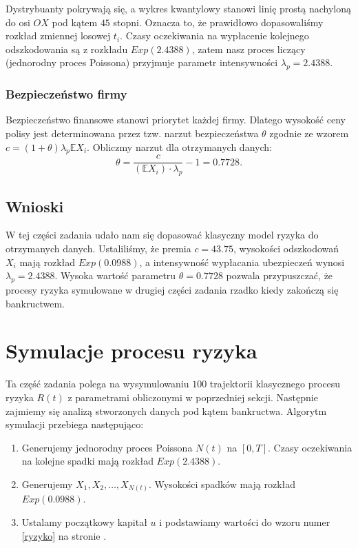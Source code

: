 \documentclass[12pt]{mwart}
\begin{document}
	\noindent Dystrybuanty pokrywają się, a wykres kwantylowy stanowi linię prostą nachyloną do osi $OX$ pod kątem $45$ stopni. Oznacza to, że prawidłowo dopasowaliśmy rozkład zmiennej losowej $t_i$. Czasy oczekiwania na wypłacenie kolejnego odszkodowania są z rozkładu $Exp(2.4388)$, zatem nasz proces liczący (jednorodny proces Poissona) przyjmuje parametr intensywności $\lambda_{p} = 2.4388$. 
	
	
	\subsubsection{Bezpieczeństwo firmy} \label{theta}
	\noindent Bezpieczeństwo finansowe stanowi priorytet każdej firmy. Dlatego wysokość ceny polisy jest determinowana przez tzw. narzut bezpieczeństwa $\theta$ zgodnie ze wzorem $c=(1+\theta)\lambda_{p} \mathbb{E} X_i$. Obliczmy narzut dla otrzymanych danych:
	$$\theta = \frac{c}{(\mathbb{E} X_i) \cdot \lambda_{p}} - 1 = 0.7728.
	$$
	
	\subsection{Wnioski}
	\noindent W tej części zadania udało nam się dopasować klasyczny model ryzyka do otrzymanych danych. Ustaliliśmy, że premia $c=43.75$, wysokości odszkodowań $X_i$ mają rozkład $Exp(0.0988)$, a intensywność wypłacania ubezpieczeń wynosi $\lambda_{p} = 2.4388$. Wysoka wartość parametru $\theta = 0.7728$ pozwala przypuszczać, że procesy ryzyka symulowane w drugiej części zadania rzadko kiedy zakończą się bankructwem.
	
	
	\section{Symulacje procesu ryzyka}
	\noindent Ta część zadania polega na wysymulowaniu $100$ trajektorii klasycznego procesu ryzyka $R(t)$ z parametrami obliczonymi w poprzedniej sekcji. Następnie zajmiemy się analizą stworzonych danych pod kątem bankructwa. Algorytm symulacji przebiega następująco:
	
	\begin{enumerate}
		\item Generujemy jednorodny proces Poissona $N(t)$ na $[0,T]$. Czasy oczekiwania na kolejne spadki mają rozkład $Exp(2.4388)$.
		\item Generujemy $X_1, X_2, \ldots, X_{N(t)}$. Wysokości spadków mają rozkład $Exp(0.0988)$.
		\item Ustalamy początkowy kapitał $u$ i podstawiamy wartości do wzoru numer \ref{ryzyko} na stronie \pageref{ryzyko}.
	\end{enumerate}
	
\end{document}
